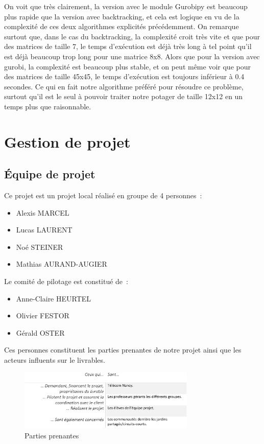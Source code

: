 \documentclass[french,a4paper]{article}
\begin{document}
On voit que très clairement, la version avec le module Gurobipy est beaucoup plus rapide que la version avec backtracking, et cela est logique en vu de la complexité de ces deux algorithmes explicités précédemment.
On remarque surtout que, dans le cas du backtracking, la complexité croit très vite et que pour des matrices de taille 7, le temps d'exécution est déjà très long à tel point qu'il est déjà beaucoup trop long pour une matrice 8x8. Alors que pour la version avec gurobi, la complexité est beaucoup plus stable, et on peut même voir que pour des matrices de taille 45x45, le temps d'exécution est toujours inférieur à 0.4 secondes. Ce qui en fait notre algorithme préféré pour résoudre ce problème, surtout qu'il est le seul à pouvoir traiter notre potager de taille 12x12 en un temps plus que raisonnable.
\newpage
\section{Gestion de projet}
\subsection{Équipe de projet}
Ce projet est un projet local réalisé en groupe de 4 personnes~:
\begin{itemize}
    \item Alexis MARCEL
    \item Lucas LAURENT
    \item Noé STEINER
    \item Mathias AURAND-AUGIER
\end{itemize}
Le comité de pilotage est constitué de~:
\begin{itemize}
    \item Anne-Claire HEURTEL
    \item Olivier FESTOR
    \item Gérald OSTER
\end{itemize}
Ces personnes constituent les parties prenantes de notre projet ainsi que les acteurs influents sur le livrables.
\begin{figure}[H]
    \centering
    \includegraphics[width=0.75\textwidth]{img/parties_prenantes.png}
    \caption{Parties prenantes}
\end{figure}
\end{document}
